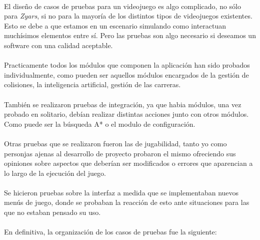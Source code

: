 
\paragraph{}
El diseño de casos de pruebas para un videojuego es algo complicado, no sólo para \emph{Zyars}, si no para la mayoría de los
distintos tipos de videojuegos existentes. Esto se debe a que estamos en un escenario simulando como interactuan muchísimos 
elementos entre sí. Pero las pruebas son algo necesario si deseamos un software con una calidad aceptable.

\paragraph{}
Practicamente todos los módulos que componen la aplicación han sido probados individualmente, como pueden ser aquellos módulos 
encargados de la gestión de colisiones, la inteligencia artificial, gestión de las carreras.

\paragraph{}
También se realizaron pruebas de integración, ya que habia módulos, una vez probado en solitario, debían realizar distintas acciones 
junto con otros módulos. Como puede ser la búsqueda A* o el modulo de configuración.

\paragraph{}
Otras pruebas que se realizaron fueron las de jugabilidad, tanto yo como personjas ajenas al desarrollo de proyecto probaron el 
mismo ofreciendo sus opiniones sobre aspectos que deberían ser modificados o errores que aparencian a lo largo de la ejecución
del juego.

\paragraph{}
Se hicieron pruebas sobre la interfaz a medida que se implementaban nuevos menús de juego, donde se probaban
la reacción de esto ante situaciones para las que no estaban pensado su uso.

\paragraph{}
En definitiva, la organización de los casos de pruebas fue la siguiente:

